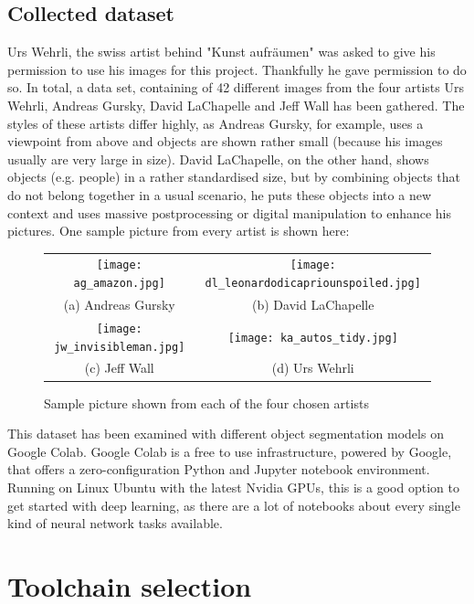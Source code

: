 \subsection{Collected dataset}

Urs Wehrli, the swiss artist behind "Kunst aufräumen" was asked to give his permission to use his images for this project. Thankfully he gave permission to do so. In total, a data set, containing of 42 different images from the four artists Urs Wehrli, Andreas Gursky, David LaChapelle and Jeff Wall has been gathered.  The styles of these artists differ highly, as Andreas Gursky, for example, uses a viewpoint from above and objects are shown rather small (because his images usually are very large in size). David LaChapelle, on the other hand, shows objects (e.g. people) in a rather standardised size, but by combining objects that do not belong together in a usual scenario, he puts these objects into a new context and uses massive postprocessing or digital manipulation to enhance his pictures. One sample picture from every artist is shown here:

\begin{figure}[H]
\begin{tabular}{cc}
 \texttt{[image: ag\_amazon.jpg]} &   \texttt{[image: dl\_leonardodicapriounspoiled.jpg]} \\
 (a) Andreas Gursky & (b) David LaChapelle \\[6pt]
 \texttt{[image: jw\_invisibleman.jpg]} &   \texttt{[image: ka\_autos\_tidy.jpg]} \\
(c) Jeff Wall & (d) Urs Wehrli \\[6pt]
\end{tabular}
\caption{Sample picture shown from each of the four chosen artists}
\label{fig:epochs-output}
\end{figure}

This dataset has been examined with different object segmentation models on Google Colab. Google Colab is a free to use infrastructure, powered by Google, that offers a zero-configuration Python and Jupyter notebook environment. Running on Linux Ubuntu with the latest Nvidia GPUs, this is a good option to get started with deep learning, as there are a lot of notebooks about every single kind of neural network tasks available.

\section{Toolchain selection}

